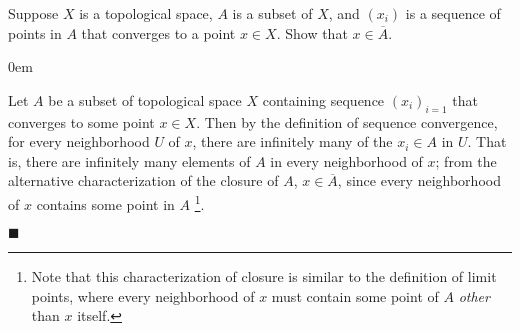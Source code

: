 \documentclass[12pt]{article}
\renewcommand{\qed}{\hfill$\blacksquare$}
\renewenvironment{proof}{\begin{addmargin}[1em]{0em}\begin{newproof}}{\end{newproof}\end{addmargin}\qed}
\newenvironment{exercise}[2][Exercise]{\begin{trivlist}
\item[\hskip \labelsep {\bfseries #1}\hskip \labelsep {\bfseries #2.}]}{\end{trivlist}}
\begin{document}
\begin{exercise}{2.14}
Suppose $X$ is a topological space, $A$ is a subset of $X$, and $\left(x_i\right)$ is a sequence of points in $A$ that converges to a point $x\in X$. Show that $x\in \overline{A}$.
\end{exercise}
\begin{proof}
Let $A$ be a subset of topological space $X$ containing sequence $\left(x_i\right)_{i=1}$ that converges to some point $x \in X$. Then by the definition of sequence convergence, for every neighborhood $U$ of $x$, there are infinitely many of the $x_i \in A$ in $U$. That is, there are infinitely many elements of $A$ in every neighborhood of $x$; from the alternative characterization of the closure of $A$, $x\in \overline{A}$, since every neighborhood of $x$ contains some point in $A$ \footnote{Note that this characterization of closure is similar to the definition of limit points, where every neighborhood of $x$ must contain some point of $A$ \textit{other} than $x$ itself.}.
\end{proof}
\end{document}
